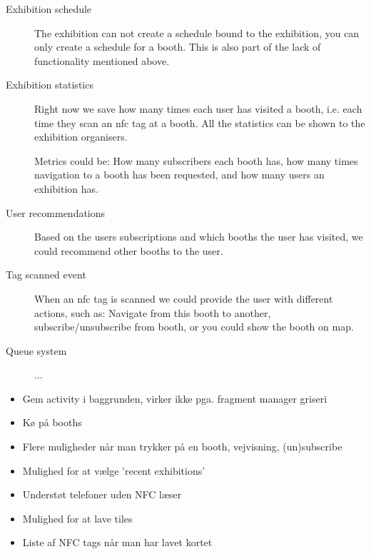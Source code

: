 \begin{description}
\item[Exhibition schedule] The exhibition can not create a schedule bound to the exhibition, you can only create a schedule for a booth. This is also part of the lack of functionality mentioned above.
\item[Exhibition statistics] Right now we save how many times each user has visited a booth, i.e. each time they scan an \ac{nfc} tag at a booth. All the statistics can be shown to the exhibition organisers.

Metrics could be: How many subscribers each booth has, how many times navigation to a booth has been requested, and how many users an exhibition has.
\item[User recommendations] Based on the users subscriptions and which booths the user has visited, we could recommend other booths to the user.
\item[Tag scanned event] When an \ac{nfc} tag is scanned we could provide the user with different actions, such as: Navigate from this booth to another, subscribe/unsubscribe from booth, or you could show the booth on map.
\item[Queue system] ...
\end{description}

\begin{itemize}
\item Gem activity i baggrunden, virker ikke pga. fragment manager griseri
\item Kø på booths
\item Flere muligheder når man trykker på en booth, vejvisning, (un)subscribe
\item Mulighed for at vælge 'recent exhibitions'
\item Understøt telefoner uden NFC læser
\item Mulighed for at lave tiles
\item Liste af NFC tags når man har lavet kortet
\end{itemize}